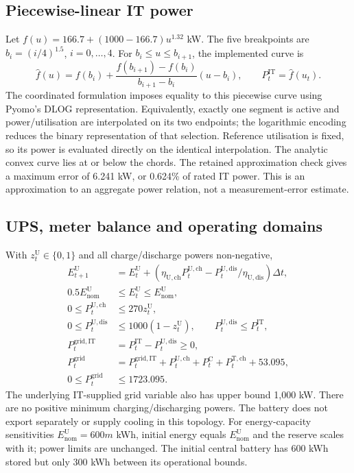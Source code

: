 \subsection{Piecewise-linear IT power}
Let $f(u)=166.7+(1000-166.7)u^{1.32}$ kW. The five breakpoints are $b_i=(i/4)^{1.5}$, $i=0,\ldots,4$. For $b_i\leq u\leq b_{i+1}$, the implemented curve is
\begin{equation}
\widehat f(u)=f(b_i)+\frac{f(b_{i+1})-f(b_i)}{b_{i+1}-b_i}(u-b_i),
\qquad P_t^{\mathrm{IT}}=\widehat f(u_t).
\end{equation}
The coordinated formulation imposes equality to this piecewise curve using Pyomo's DLOG representation. Equivalently, exactly one segment is active and power/utilisation are interpolated on its two endpoints; the logarithmic encoding reduces the binary representation of that selection. Reference utilisation is fixed, so its power is evaluated directly on the identical interpolation. The analytic convex curve lies at or below the chords. The retained approximation check gives a maximum error of 6.241 kW, or 0.624\% of rated IT power. This is an approximation to an aggregate power relation, not a measurement-error estimate.

\subsection{UPS, meter balance and operating domains}
With $z_t^{\mathrm U}\in\{0,1\}$ and all charge/discharge powers non-negative,
\begin{align}
E_{t+1}^{\mathrm U}&=E_t^{\mathrm U}+
\left(\eta_{\mathrm{U,ch}}P_t^{\mathrm{U,ch}}-P_t^{\mathrm{U,dis}}/\eta_{\mathrm{U,dis}}\right)\Delta t,\\
0.5E_{\mathrm{nom}}^{\mathrm U}&\leq E_t^{\mathrm U}\leq E_{\mathrm{nom}}^{\mathrm U},\\
0\leq P_t^{\mathrm{U,ch}}&\leq270z_t^{\mathrm U},\\
0\leq P_t^{\mathrm{U,dis}}&\leq1000(1-z_t^{\mathrm U}),\qquad P_t^{\mathrm{U,dis}}\leq P_t^{\mathrm{IT}},\\
P_t^{\mathrm{grid,IT}}&=P_t^{\mathrm{IT}}-P_t^{\mathrm{U,dis}}\geq0,\\
P_t^{\mathrm{grid}}&=P_t^{\mathrm{grid,IT}}+P_t^{\mathrm{U,ch}}+P_t^{\mathrm C}+P_t^{\mathrm{T,ch}}+53.095,\\
0\leq P_t^{\mathrm{grid}}&\leq1723.095.
\end{align}
The underlying IT-supplied grid variable also has upper bound 1,000 kW. There are no positive minimum charging/discharging powers. The battery does not export separately or supply cooling in this topology. For energy-capacity sensitivities $E_{\mathrm{nom}}^{\mathrm U}=600m$ kWh, initial energy equals $E_{\mathrm{nom}}^{\mathrm U}$ and the reserve scales with it; power limits are unchanged. The initial central battery has 600 kWh stored but only 300 kWh between its operational bounds.

